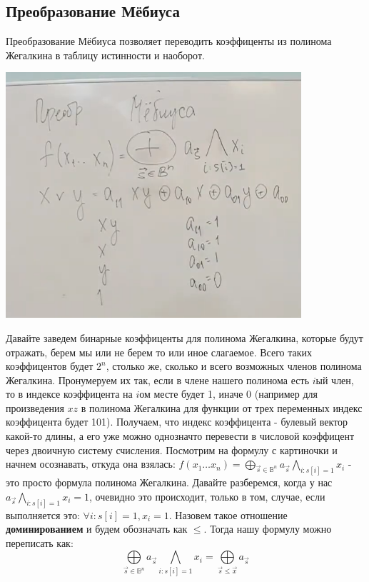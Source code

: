 

\subsection{Преобразование Мёбиуса}
Преобразование Мёбиуса позволяет переводить коэффиценты из полинома Жегалкина в таблицу истинности и наоборот. 

\begin{center}
  \includegraphics[height=9.1cm]{assets/Mebius.png}
\end{center}
  

Давайте заведем бинарные коэффиценты для полинома Жегалкина, которые будут отражать, берем мы или не берем то или иное слагаемое. Всего таких коэффицентов будет $2^n$, столько же, сколько и всего возможных членов полинома Жегалкина. Пронумеруем их так, если в члене нашего полинома есть $i$ый член, то в индексе коэффицента на $i$ом месте будет 1, иначе 0 (например для произведения $xz$ в полинома Жегалкина для функции от трех переменных индекс коэффицента будет 101). Получаем, что индекс коэффицента - булевый вектор какой-то длины, а его уже можно однозначто перевести в числовой коэффицент через двоичную систему счисления.
\newpage
Посмотрим на формулу с картиночки и начнем осознавать, откуда она взялась:
$\displaystyle f(x_1\dots x_n) = \bigoplus\limits_{\overrightarrow{s}\in\mathbb{B}^n}a_{\overrightarrow{s}}\bigwedge\limits_{i:s[i]=1}x_i$ - это просто формула полинома Жегалкина. Давайте разберемся, когда у нас $a_{\overrightarrow{s}}\bigwedge\limits_{i:s[i]=1}x_i=1$, очевидно это происходит, только в том, случае, если выполняется это: $\forall i : s[i] = 1, x_i = 1$. Назовем такое отношение \textbf{доминированием} и будем обозначать как $\leq$.
Тогда нашу формулу можно переписать как: $$\bigoplus\limits_{\overrightarrow{s}\in\mathbb{B}^n}a_{\overrightarrow{s}}\bigwedge\limits_{i:s[i]=1}x_i = \bigoplus\limits_{\overrightarrow{s}\leq \overrightarrow{x}} a_{\overrightarrow{s}}$$ 

